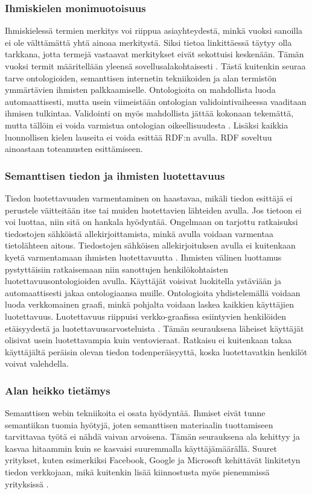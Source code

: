 \documentclass[finnish, 12pt, a4paper, elec, utf8, pdfa, online]{aaltothesis}
\begin{document}
{\subsubsection{Ihmiskielen monimuotoisuus}
Ihmiskielessä termien merkitys voi riippua asiayhteydestä, minkä vuoksi sanoilla ei ole välttämättä yhtä ainoaa merkitystä. Siksi tietoa linkittäessä täytyy olla tarkkana, jotta termejä vastaavat merkitykset eivät sekottuisi keskenään. Tämän vuoksi termit määritellään yleensä sovellusalakohtaisesti \cite{linked_data_finlad}. Tästä kuitenkin seuraa tarve ontologioiden, semanttisen internetin tekniikoiden ja alan termistön ymmärtävien ihmisten palkkaamiselle. Ontologioita on mahdollista luoda automaattisesti, mutta usein viimeistään ontologian validointivaiheessa vaaditaan ihmisen tulkintaa. Validointi on myös mahdollista jättää kokonaan tekemättä, mutta tällöin ei voida varmistua ontologian oikeellisuudesta \cite{automatic_ontology}. Lisäksi kaikkia luonnollisen kielen lauseita ei voida esittää RDF:n avulla. RDF soveltuu ainoastaan toteamusten esittämiseen.

\subsubsection{Semanttisen tiedon ja ihmisten luotettavuus}
Tiedon luotettavuuden varmentaminen on haastavaa, mikäli tiedon esittäjä ei perustele väitteitään itse tai muiden luotettavien lähteiden avulla. Jos tietoon ei voi luottaa, niin sitä on hankala hyödyntää. Ongelmaan on tarjottu ratkaisuksi tiedostojen sähköistä allekirjoittamista, minkä avulla voidaan varmentaa tietolähteen aitous. Tiedostojen sähköisen allekirjoituksen avulla ei kuitenkaan kyetä varmentamaan ihmisten luotettavuutta \cite{trust}. Ihmisten välinen luottamus pystyttäisiin ratkaisemaan niin sanottujen henkilökohtaisten luotettavuusontologioiden avulla. Käyttäjät voisivat luokitella ystäviään ja automaattisesti jakaa ontologiaansa muille. Ontologioita yhdistelemällä voidaan luoda verkkomainen graafi, minkä pohjalta voidaan laskea kaikkien käyttäjien luotettavuus.
Luotettavuus riippuisi verkko-graafissa esiintyvien henkilöiden etäisyydestä ja luotettavuusarvosteluista \cite{trust}. Tämän seurauksena läheiset käyttäjät olisivat usein luotettavampia kuin ventovieraat. Ratkaisu ei kuitenkaan takaa käyttäjältä peräisin olevan tiedon todenperäisyyttä, koska luotettavatkin henkilöt voivat valehdella.

\subsubsection{Alan heikko tietämys}
Semanttisen webin tekniikoita ei osata hyödyntää. Ihmiset eivät tunne semantiikan tuomia hyötyjä, joten semanttisen materiaalin tuottamiseen tarvittavaa työtä ei nähdä vaivan arvoisena. Tämän seurauksena ala kehittyy ja kasvaa hitaammin kuin se kasvaisi suuremmalla käyttäjämäärällä. Suuret yritykset, kuten esimerkiksi Facebook, Google ja Microsoft kehittävät linkitetyn tiedon verkkojaan, mikä kuitenkin lisää kiinnostusta myös pienemmissä yrityksissä \cite{Facebook} \cite{knowledge_graph} \cite{cortana}.


}
\end{document}
